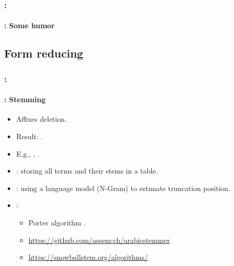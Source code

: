 \documentclass[xcolor=table]{beamer}
\begin{document}
\begin{frame}
	\frametitle{\insertshortsubtitle: \insertsection}
	\framesubtitle{\insertsubsection: Some humor}

	\begin{center}
	\end{center}

\end{frame}

\subsection{Form reducing}

\begin{frame}
	\frametitle{\insertshortsubtitle: \insertsection}
	\framesubtitle{\insertsubsection: Stemming}

	\begin{itemize}
		\item Affixes deletion.
		\item Result: .
		\item E.g., , .
		\item {}: storing all terms and their stems in a table.
		\item {}: using a language model (N-Gram) to estimate truncation position.
		\item {}:
		\begin{itemize}
			\item Porter algorithm \cite{1980-porter}.
			\item \url{https://github.com/assem-ch/arabicstemmer}
			\item \url{https://snowballstem.org/algorithms/}
		\end{itemize}
	\end{itemize}

\end{frame}
\end{document}
